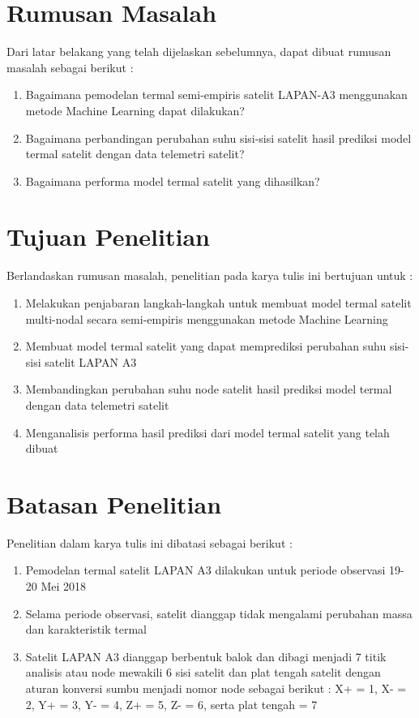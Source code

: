 \section{Rumusan Masalah}

Dari latar belakang yang telah dijelaskan sebelumnya, dapat dibuat rumusan masalah sebagai berikut :

\begin{enumerate}
\item Bagaimana pemodelan termal semi-empiris satelit LAPAN-A3 menggunakan metode Machine Learning dapat dilakukan?
\item Bagaimana perbandingan perubahan suhu sisi-sisi satelit hasil prediksi model termal satelit dengan data telemetri satelit?
\item Bagaimana performa model termal satelit yang dihasilkan?
\end{enumerate}

\section{Tujuan Penelitian}

Berlandaskan rumusan masalah, penelitian pada karya tulis ini bertujuan untuk :

\begin{enumerate}
\item Melakukan penjabaran langkah-langkah untuk membuat model termal satelit multi-nodal secara semi-empiris menggunakan metode Machine Learning
\item Membuat model termal satelit yang dapat memprediksi perubahan suhu sisi-sisi satelit LAPAN A3
\item Membandingkan perubahan suhu node satelit hasil prediksi model termal dengan data telemetri satelit
\item Menganalisis performa hasil prediksi dari model termal satelit yang telah dibuat
\end{enumerate}

\section{Batasan Penelitian}

Penelitian dalam karya tulis ini dibatasi sebagai berikut :

\begin{enumerate}
\item Pemodelan termal satelit LAPAN A3 dilakukan untuk periode observasi 19-20 Mei 2018
\item Selama periode observasi, satelit dianggap tidak mengalami perubahan massa dan karakteristik termal
\item Satelit LAPAN A3 dianggap berbentuk balok dan dibagi menjadi 7 titik
	analisis atau node mewakili 6 sisi satelit dan plat tengah satelit dengan
		aturan konversi sumbu menjadi nomor node sebagai berikut : X+ = 1, X- = 2,
		Y+ = 3, Y- = 4, Z+ = 5, Z- = 6, serta plat tengah = 7
\end{enumerate}

